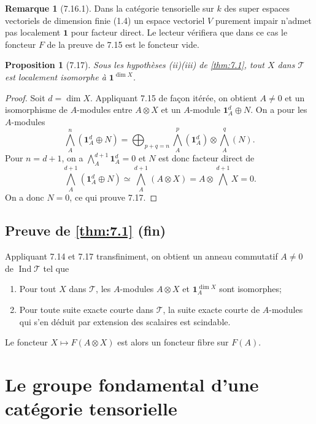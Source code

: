 \documentclass[12pt,a4paper]{article}
\theoremstyle{plain}
\newtheorem{proposition}[theorem]{Proposition}
\theoremstyle{definition}
\newtheorem{remark}[theorem]{Remarque}
\DeclareMathOperator{\Ind}{Ind}
\begin{document}
\begin{remark}[7.16.1]
Dans la catégorie tensorielle sur $k$ des super espaces vectoriels de dimension finie (1.4) un espace vectoriel $V$ purement impair n'admet pas localement $\mathbf{1}$ pour facteur direct. Le lecteur vérifiera que dans ce cas le foncteur $F$ de la preuve de 7.15 est le foncteur vide.
\end{remark}

\begin{proposition}[7.17]
Sous les hypothèses \textup{(ii)(iii)} de \ref{thm:7.1}, tout $X$ dans $\mathcal{T}$ est localement isomorphe à $\mathbf{1}^{\dim X}$.
\end{proposition}

\begin{proof}
Soit $d = \dim X$. Appliquant 7.15 de façon itérée, on obtient $A \neq 0$ et un isomorphisme de $A$-modules entre $A \otimes X$ et un $A$-module $\mathbf{1}_A^d \oplus N$. On a pour les $A$-modules
\[
\bigwedge^n_A(\mathbf{1}_A^d \oplus N) = \bigoplus_{p+q=n} \bigwedge^p_A(\mathbf{1}_A^d) \otimes \bigwedge^q_A(N).
\]
Pour $n = d+1$, on a $\bigwedge^{d+1}_A \mathbf{1}_A^d = 0$ et $N$ est donc facteur direct de
\[
\bigwedge^{d+1}_A(\mathbf{1}_A^d \oplus N) \simeq \bigwedge^{d+1}_A(A \otimes X) = A \otimes \bigwedge^{d+1} X = 0.
\]
On a donc $N = 0$, ce qui prouve 7.17.
\end{proof}

\subsection{Preuve de \ref{thm:7.1} (fin)}

Appliquant 7.14 et 7.17 transfiniment, on obtient un anneau commutatif $A \neq 0$ de $\Ind\mathcal{T}$ tel que
\begin{enumerate}
\item[(7.19.1)] Pour tout $X$ dans $\mathcal{T}$, les $A$-modules $A \otimes X$ et $\mathbf{1}_A^{\dim X}$ sont isomorphes;
\item[(7.19.2)] Pour toute suite exacte courte dans $\mathcal{T}$, la suite exacte courte de $A$-modules qui s'en déduit par extension des scalaires est scindable.
\end{enumerate}

Le foncteur $X \mapsto F(A \otimes X)$ est alors un foncteur fibre sur $F(A)$.

\section{Le groupe fondamental d'une catégorie tensorielle}
\end{document}
